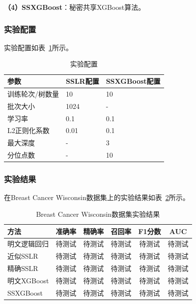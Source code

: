 \textbf{（4）SSXGBoost}：秘密共享XGBoost算法。

\subsubsection{实验配置}

实验配置如表~\ref{tab:exp-config}所示。

\begin{table}[htbp]
    \centering
    \caption{实验配置}
    \label{tab:exp-config}
    \begin{tabular}{lll}
        \toprule
        \textbf{参数} & \textbf{SSLR配置} & \textbf{SSXGBoost配置} \\
        \midrule
        训练轮次/树数量 & 10 & 10 \\
        批次大小 & 1024 & - \\
        学习率 & 0.1 & 0.1 \\
        L2正则化系数 & 0.01 & 0.1 \\
        最大深度 & - & 3 \\
        分位点数 & - & 10 \\
        \bottomrule
    \end{tabular}
\end{table}

\subsubsection{实验结果}

在Breast Cancer Wisconsin数据集上的实验结果如表~\ref{tab:exp-cancer}所示。

\begin{table}[htbp]
    \centering
    \caption{Breast Cancer Wisconsin数据集实验结果}
    \label{tab:exp-cancer}
    \begin{tabular}{lccccc}
        \toprule
        \textbf{方法} & \textbf{准确率} & \textbf{精确率} & \textbf{召回率} & \textbf{F1分数} & \textbf{AUC} \\
        \midrule
        明文逻辑回归 & 待测试 & 待测试 & 待测试 & 待测试 & 待测试 \\
        近似SSLR & 待测试 & 待测试 & 待测试 & 待测试 & 待测试 \\
        精确SSLR & 待测试 & 待测试 & 待测试 & 待测试 & 待测试 \\
        \midrule
        明文XGBoost & 待测试 & 待测试 & 待测试 & 待测试 & 待测试 \\
        SSXGBoost & 待测试 & 待测试 & 待测试 & 待测试 & 待测试 \\
        \bottomrule
    \end{tabular}
\end{table}


